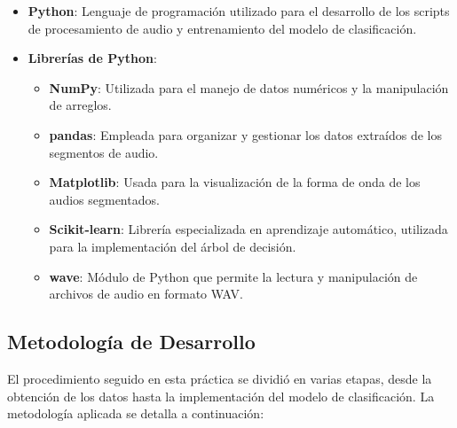 \documentclass{report}
\begin{document}
\begin{itemize}
    \item \textbf{Python}: Lenguaje de programación utilizado para el desarrollo de los scripts de procesamiento de audio y entrenamiento del modelo de clasificación.
    \item \textbf{Librerías de Python}:
    \begin{itemize}
        \item \textbf{NumPy}: Utilizada para el manejo de datos numéricos y la manipulación de arreglos.
        \item \textbf{pandas}: Empleada para organizar y gestionar los datos extraídos de los segmentos de audio.
        \item \textbf{Matplotlib}: Usada para la visualización de la forma de onda de los audios segmentados.
        \item \textbf{Scikit-learn}: Librería especializada en aprendizaje automático, utilizada para la implementación del árbol de decisión.
        \item \textbf{wave}: Módulo de Python que permite la lectura y manipulación de archivos de audio en formato WAV.
    \end{itemize}
\end{itemize}

\subsection{Metodología de Desarrollo}

El procedimiento seguido en esta práctica se dividió en varias etapas, desde la obtención de los datos hasta la implementación del modelo de clasificación. La metodología aplicada se detalla a continuación:
\end{document}
